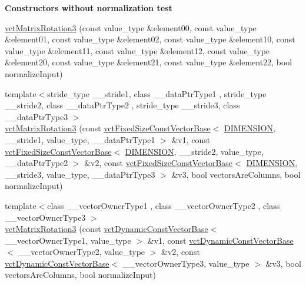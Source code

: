 \begin{Indent}{\bf Constructors without normalization test}
{\begin{DoxyItemize}
\end{DoxyItemize}}\begin{DoxyCompactItemize}
\item 
\hyperlink{classvct_matrix_rotation3_a4c2e3e5bf0547bd9c38b97789205e4d4}{vct\+Matrix\+Rotation3} (const value\+\_\+type \&element00, const value\+\_\+type \&element01, const value\+\_\+type \&element02, const value\+\_\+type \&element10, const value\+\_\+type \&element11, const value\+\_\+type \&element12, const value\+\_\+type \&element20, const value\+\_\+type \&element21, const value\+\_\+type \&element22, bool normalize\+Input)
\item 
{\footnotesize template$<$stride\+\_\+type \+\_\+\+\_\+stride1, class \+\_\+\+\_\+data\+Ptr\+Type1 , stride\+\_\+type \+\_\+\+\_\+stride2, class \+\_\+\+\_\+data\+Ptr\+Type2 , stride\+\_\+type \+\_\+\+\_\+stride3, class \+\_\+\+\_\+data\+Ptr\+Type3 $>$ }\\\hyperlink{classvct_matrix_rotation3_a8702f185e21ff2b44614e0b03a9226c0}{vct\+Matrix\+Rotation3} (const \hyperlink{classvct_fixed_size_const_vector_base}{vct\+Fixed\+Size\+Const\+Vector\+Base}$<$ \hyperlink{group__cisst_vector_ggaa21ad8fcafb1ab9d70efcec9bda6eab2af25ebbcafe4db62f894c21db0608cd65}{D\+I\+M\+E\+N\+S\+I\+O\+N}, \+\_\+\+\_\+stride1, value\+\_\+type, \+\_\+\+\_\+data\+Ptr\+Type1 $>$ \&v1, const \hyperlink{classvct_fixed_size_const_vector_base}{vct\+Fixed\+Size\+Const\+Vector\+Base}$<$ \hyperlink{group__cisst_vector_ggaa21ad8fcafb1ab9d70efcec9bda6eab2af25ebbcafe4db62f894c21db0608cd65}{D\+I\+M\+E\+N\+S\+I\+O\+N}, \+\_\+\+\_\+stride2, value\+\_\+type, \+\_\+\+\_\+data\+Ptr\+Type2 $>$ \&v2, const \hyperlink{classvct_fixed_size_const_vector_base}{vct\+Fixed\+Size\+Const\+Vector\+Base}$<$ \hyperlink{group__cisst_vector_ggaa21ad8fcafb1ab9d70efcec9bda6eab2af25ebbcafe4db62f894c21db0608cd65}{D\+I\+M\+E\+N\+S\+I\+O\+N}, \+\_\+\+\_\+stride3, value\+\_\+type, \+\_\+\+\_\+data\+Ptr\+Type3 $>$ \&v3, bool vectors\+Are\+Columns, bool normalize\+Input)
\item 
{\footnotesize template$<$class \+\_\+\+\_\+vector\+Owner\+Type1 , class \+\_\+\+\_\+vector\+Owner\+Type2 , class \+\_\+\+\_\+vector\+Owner\+Type3 $>$ }\\\hyperlink{classvct_matrix_rotation3_aac335f5af8a4963aadfac940161c4a0e}{vct\+Matrix\+Rotation3} (const \hyperlink{classvct_dynamic_const_vector_base}{vct\+Dynamic\+Const\+Vector\+Base}$<$ \+\_\+\+\_\+vector\+Owner\+Type1, value\+\_\+type $>$ \&v1, const \hyperlink{classvct_dynamic_const_vector_base}{vct\+Dynamic\+Const\+Vector\+Base}$<$ \+\_\+\+\_\+vector\+Owner\+Type2, value\+\_\+type $>$ \&v2, const \hyperlink{classvct_dynamic_const_vector_base}{vct\+Dynamic\+Const\+Vector\+Base}$<$ \+\_\+\+\_\+vector\+Owner\+Type3, value\+\_\+type $>$ \&v3, bool vectors\+Are\+Columns, bool normalize\+Input)

\end{DoxyCompactItemize}
\end{Indent}
